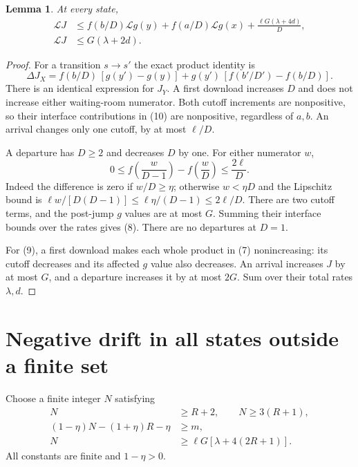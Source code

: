 \documentclass[11pt]{article}
\newtheorem{lemma}{Lemma}
\newcommand{\LL}{\mathcal L}
\begin{document}
\begin{lemma}\label{lem:interface}
At every state,
\begin{align}
 \LL J&\le f(b/D)\LL g(y)+f(a/D)\LL g(x)
                  +\frac{\ell G(\lambda+4d)}D,               \tag{8}\\
 \LL J&\le G(\lambda+2d).                                    \tag{9}
\end{align}
\end{lemma}
\begin{proof}
For a transition $s\to s'$ the exact product identity is
\[
 \Delta J_X=f(b/D)\,[g(y')-g(y)]
              +g(y')\,[f(b'/D')-f(b/D)].                      \tag{10}
\]
There is an identical expression for $J_Y$.
A first download increases $D$ and does not increase either waiting-room
numerator. Both cutoff increments are nonpositive, so their interface
contributions in (10) are nonpositive, regardless of $a,b$.
An arrival changes only one cutoff, by at most $\ell/D$.

A departure has $D\ge2$ and decreases $D$ by one. For either numerator
$w$,
\[
 0\le f\!\left(\frac w{D-1}\right)-f\!\left(\frac wD\right)
       \le \frac{2\ell}D.                                    \tag{11}
\]
Indeed the difference is zero if $w/D\ge\eta$; otherwise
$w<\eta D$ and the Lipschitz bound is
$\ell w/[D(D-1)]\le \ell\eta/(D-1)\le2\ell/D$.
There are two cutoff terms, and the post-jump $g$ values are at most
$G$. Summing their interface bounds over the rates gives (8).
There are no departures at $D=1$.

For (9), a first download makes each whole product in (7)
nonincreasing: its cutoff decreases and its affected $g$ value also
decreases. An arrival increases $J$ by at most $G$, and a departure
increases it by at most $2G$. Sum over their total rates $\lambda,d$.
\end{proof}

\section{Negative drift in all states outside a finite set}

Choose a finite integer $N$ satisfying
\begin{align*}
 N&\ge R+2,\qquad N\ge3(R+1),\\
 (1-\eta)N-(1+\eta)R-\eta&\ge m,\\
 N&\ge\ell G[\lambda+4(2R+1)].
\end{align*}
All constants are finite and $1-\eta>0$.
\end{document}

